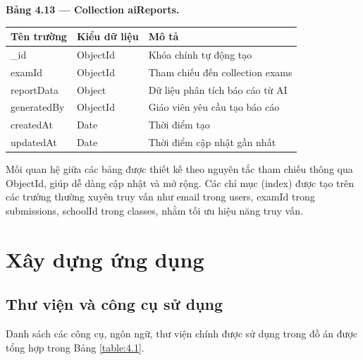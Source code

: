 ﻿\documentclass[../DoAn.tex]{subfiles}
\begin{document}
\vspace{0.3cm}

\noindent\textbf{Bảng 4.13 — Collection aiReports.}
\begin{center}
\begin{tabular}{|p{3.5cm}|p{2.5cm}|p{7cm}|}
\hline
\textbf{Tên trường} & \textbf{Kiểu dữ liệu} & \textbf{Mô tả} \\ \hline
\_id & ObjectId & Khóa chính tự động tạo \\ \hline
examId & ObjectId & Tham chiếu đến collection exams \\ \hline
reportData & Object & Dữ liệu phân tích báo cáo từ AI \\ \hline
generatedBy & ObjectId & Giáo viên yêu cầu tạo báo cáo \\ \hline
createdAt & Date & Thời điểm tạo \\ \hline
updatedAt & Date & Thời điểm cập nhật gần nhất \\ \hline
\end{tabular}
\end{center}

Mối quan hệ giữa các bảng được thiết kế theo nguyên tắc tham chiếu thông qua ObjectId, giúp dễ dàng cập nhật và mở rộng. Các chỉ mục (index) được tạo trên các trường thường xuyên truy vấn như email trong users, examId trong submissions, schoolId trong classes, nhằm tối ưu hiệu năng truy vấn.

\section{Xây dựng ứng dụng}
\label{section:4.3}

\subsection{Thư viện và công cụ sử dụng}
\label{subsection:4.3.1}

Danh sách các công cụ, ngôn ngữ, thư viện chính được sử dụng trong đồ án được tổng hợp trong Bảng \ref{table:4.1}.
\end{document}
